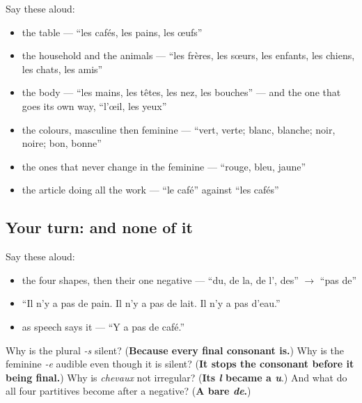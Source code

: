 Say these aloud:

\begin{itemize}
\raggedright
  \item the table — \textquotedblleft{}les cafés, les pains, les œufs\textquotedblright{}
  \item the household and the animals — \textquotedblleft{}les frères, les sœurs, les enfants, les chiens, les chats, les amis\textquotedblright{}
  \item the body — \textquotedblleft{}les mains, les têtes, les nez, les bouches\textquotedblright{} — and the one that goes its own way, \textquotedblleft{}l'œil, les yeux\textquotedblright{}
  \item the colours, masculine then feminine — \textquotedblleft{}vert, verte; blanc, blanche; noir, noire; bon, bonne\textquotedblright{}
  \item the ones that never change in the feminine — \textquotedblleft{}rouge, bleu, jaune\textquotedblright{}
  \item the article doing all the work — \textquotedblleft{}le café\textquotedblright{} against \textquotedblleft{}les cafés\textquotedblright{}
\end{itemize}

\subsection*{Your turn: and none of it}
Say these aloud:

\begin{itemize}
\raggedright
  \item the four shapes, then their one negative — \textquotedblleft{}du, de la, de l', des\textquotedblright{} $\to$ \textquotedblleft{}pas de\textquotedblright{}
  \item \textquotedblleft{}Il n'y a pas de pain. Il n'y a pas de lait. Il n'y a pas d'eau.\textquotedblright{}
  \item as speech says it — \textquotedblleft{}Y a pas de café.\textquotedblright{}
\end{itemize}

\begin{tcolorbox}[breakable,colback=teal!4,colframe=teal!35!black,title={Before you move on}]
Why is the plural \emph{-s} silent? (\textbf{Because every final consonant is.}) Why is the feminine \emph{-e} audible even though it is silent? (\textbf{It stops the consonant before it being final.}) Why is \emph{chevaux} not irregular? (\textbf{Its \emph{l} became a \emph{u}}.) And what do all four partitives become after a negative? (\textbf{A bare \emph{de}.})
\end{tcolorbox}
